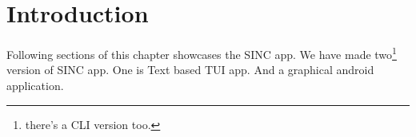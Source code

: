 \documentclass[../../main]{subfiles}
\begin{document}
\section{Introduction} \label{sec:}

Following sections of this chapter showcases the SINC app. We have made two\footnote{there's a CLI
version too.} version of SINC app. One is Text based TUI app. And a graphical android application.
\end{document}
